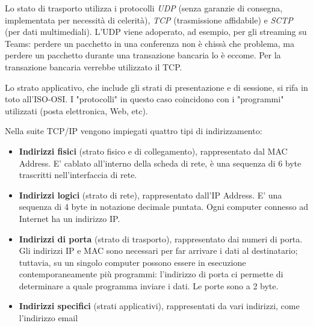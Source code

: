 \vspace{3mm}

Lo stato di trasporto utilizza i protocolli \textit{UDP} (senza garanzie di consegna, implementata per necessità di celerità), \textit{TCP} (trasmissione affidabile) e \textit{SCTP} (per dati multimediali). L'UDP viene adoperato, ad esempio, per gli streaming su Teams: perdere un pacchetto in una conferenza non è chissà che problema, ma perdere un pacchetto durante una transazione bancaria lo è eccome. Per la transazione bancaria verrebbe utilizzato il TCP.

\vspace{3mm}

Lo strato applicativo, che include gli strati di presentazione e di sessione, si rifa in toto all'ISO-OSI. I "protocolli" in questo caso coincidono con i "programmi" utilizzati (posta elettronica, Web, etc).

\vspace{3mm}

Nella suite TCP/IP vengono impiegati quattro tipi di indirizzamento:

\begin{itemize}
    \item 
        \textbf{Indirizzi fisici} (strato fisico e di collegamento), rappresentato dal MAC Address. E' cablato all'interno della scheda di rete, è una sequenza di 6 byte trascritti nell'interfaccia di rete.
    
    \item
        \textbf{Indirizzi logici} (strato di rete), rappresentato dall'IP Address. E' una sequenza di 4 byte in notazione decimale puntata. Ogni computer connesso ad Internet ha un indirizzo IP.
    
    \item
        \textbf{Indirizzi di porta }(strato di trasporto), rappresentato dai numeri di porta. Gli indirizzi IP e MAC sono necessari per far arrivare i dati al destinatario; tuttavia, su un singolo computer possono essere in esecuzione contemporaneamente più programmi: l'indirizzo di porta ci permette di determinare a quale programma inviare i dati. Le porte sono a 2 byte.
    
    \item
        \textbf{Indirizzi specifici} (strati applicativi), rappresentati da vari indirizzi, come l'indirizzo email
    
\end{itemize}
